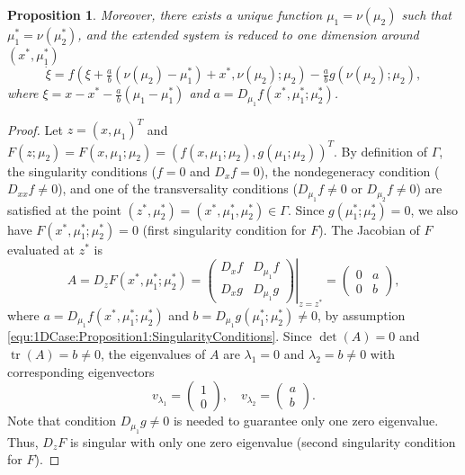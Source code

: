 \documentclass[12pt]{article}
\newtheorem{proposition}{Proposition}
\begin{document}
\begin{proposition}
    Moreover, there exists a unique function $\mu_{1}=\nu(\mu_{2})$ such that $\mu_{1}^{*}=\nu(\mu_{2}^{*})$, and the extended system is reduced to one dimension around $(x^{*},\mu_{1}^{*})$
    \begin{equation*}
        \dot \xi=f(\xi+\tfrac{a}{b}(\nu(\mu_{2})-\mu_{1}^{*})+x^{*}, \nu(\mu_{2});\mu_{2})-\tfrac{a}{b}g(\nu(\mu_{2});\mu_{2}),
    \end{equation*}
    where $\xi=x-x^{*}-\frac{a}{b}(\mu_{1}-\mu_{1}^{*})$ and $a=D_{\mu_{1}}f(x^{*},\mu_{1}^{*};\mu_{2}^{*})$.
\end{proposition}
\begin{proof}
    Let $z=(x, \mu_{1})^{T}$ and $F(z;\mu_{2})=F(x,\mu_{1};\mu_{2})=(f(x,\mu_{1};\mu_{2}),g(\mu_{1};\mu_{2}))^{T}$. By definition of $\Gamma$, the singularity conditions ($f=0$ and $D_{x}f=0$), the nondegeneracy condition ($D_{xx}f\neq0$), and one of the transversality conditions ($D_{\mu_{1}}f\neq0$ or $D_{\mu_{2}}f\neq0$) are satisfied at the point $(z^{*},\mu_{2}^{*})=(x^{*},\mu_{1}^{*},\mu_{2}^{*})\in\Gamma$. Since $g(\mu_{1}^{*};\mu_{2}^{*})=0$, we also have $F(x^{*},\mu_{1}^{*};\mu_{2}^{*})=0$ (first singularity condition for $F$). The Jacobian of $F$ evaluated at $z^{*}$ is
    \begin{equation*}
    A=D_{z}F(x^{*},\mu_{1}^{*};\mu_{2}^{*})=
    \left.\begin{pmatrix}
        D_{x}f & D_{\mu_{1}}f \\
        D_{x}g & D_{\mu_{1}}g
    \end{pmatrix}\right|_{z=z^{*}}=
    \begin{pmatrix}
        0 & a \\
        0 & b
    \end{pmatrix},
    \end{equation*}
    where $a=D_{\mu_{1}}f(x^{*},\mu_{1}^{*};\mu_{2}^{*})$ and $b=D_{\mu_{1}}g(\mu_{1}^{*};\mu_{2}^{*})\neq0$, by assumption \eqref{equ:1DCase:Proposition1:SingularityConditions}. Since $\det(A)=0$ and $\mathop\mathrm{tr}(A)=b\neq 0$, the eigenvalues of $A$ are $\lambda_{1}=0$ and $\lambda_{2}=b\neq 0$ with corresponding eigenvectors
    \[v_{\lambda_{1}}=\begin{pmatrix} 1 \\ 0 \end{pmatrix},
    \quad v_{\lambda_{2}}=\begin{pmatrix} a \\ b \end{pmatrix}.\]
    Note that condition $D_{\mu_{1}}g\neq0$ is needed to guarantee only one zero eigenvalue. Thus, $D_{z}F$ is singular with only one zero eigenvalue (second singularity condition for $F$).


\end{proof}
\end{document}
